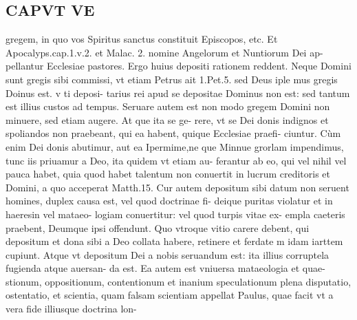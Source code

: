 \documentclass{article}
\begin{document}
\begin{pages}
\section*{CAPVT VE }
\marginpar{[ p.509 ]}\pstart gregem, in quo vos Spiritus sanctus constituit Episcopos, etc. Et Apocalyps.cap.1.v.2. et Malac. 2. nomine Angelorum et Nuntiorum Dei ap- pellantur Ecclesiae pastores. Ergo huius depositi rationem reddent. Neque Domini sunt gregis sibi commissi, vt etiam Petrus ait 1.Pet.5. sed Deus iple mus gregis Doinus est. v ti deposi- tarius rei apud se depositae Dominus non est: sed tantum est illius custos ad tempus.  \pend\pstart Seruare autem est non modo gregem Domini non minuere, sed etiam augere. At que ita se ge- rere, vt se Dei donis indignos et spoliandos non praebeant, qui ea habent, quique Ecclesiae praefi- ciuntur. Cùm enim Dei donis abutimur, aut ea Ipermime,ne que Minnue grorlam impendimus, tunc iis priuamur a Deo, ita quidem vt etiam au- ferantur ab eo, qui vel nihil vel pauca habet, quia quod habet talentum non conuertit in lucrum creditoris et Domini, a quo acceperat Matth.15.  \pend\pstart Cur autem depositum sibi datum non seruent homines, duplex causa est, vel quod doctrinae fi- deique puritas violatur et in haeresin vel mataeo- logiam conuertitur: vel quod turpis vitae ex- empla caeteris praebent, Deumque ipsi offendunt. Quo vtroque vitio carere debent, qui depositum et dona sibi a Deo collata habere, retinere et ferdate m idam iarttem cupiunt.  \pend\pstart Atque vt depositum Dei a nobis seruandum est: ita illius corruptela fugienda atque auersan- da est. Ea autem est vniuersa mataeologia et quae- stionum, oppositionum, contentionum et inanium speculationum plena disputatio, ostentatio, et scientia, quam falsam scientiam appellat Paulus, quae facit vt a vera fide illiusque doctrina lon-  \pend

\end{pages}
\end{document}
